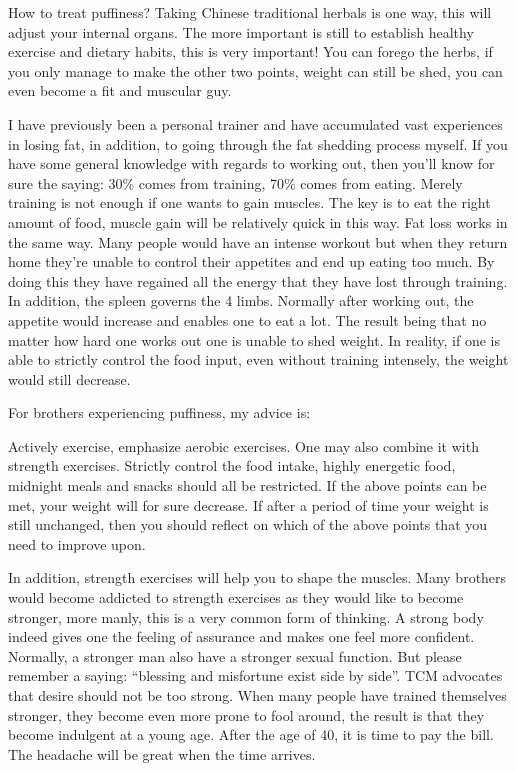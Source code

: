 \documentclass[
]{book}
\begin{document}
How to treat puffiness? Taking Chinese traditional herbals is one way, this will adjust your internal organs. The more important is still to establish healthy exercise and dietary habits, this is very important! You can forego the herbs, if you only manage to make the other two points, weight can still be shed, you can even become a fit and muscular guy.

I have previously been a personal trainer and have accumulated vast experiences in losing fat, in addition, to going through the fat shedding process myself. If you have some general knowledge with regards to working out, then you'll know for sure the saying: 30\% comes from training, 70\% comes from eating. Merely training is not enough if one wants to gain muscles. The key is to eat the right amount of food, muscle gain will be relatively quick in this way. Fat loss works in the same way. Many people would have an intense workout but when they return home they're unable to control their appetites and end up eating too much. By doing this they have regained all the energy that they have lost through training. In addition, the spleen governs the 4 limbs. Normally after working out, the appetite would increase and enables one to eat a lot. The result being that no matter how hard one works out one is unable to shed weight. In reality, if one is able to strictly control the food input, even without training intensely, the weight would still decrease.

For brothers experiencing puffiness, my advice is:

Actively exercise, emphasize aerobic exercises. One may also combine it with strength exercises.
Strictly control the food intake, highly energetic food, midnight meals and snacks should all be restricted.
If the above points can be met, your weight will for sure decrease. If after a period of time your weight is still unchanged, then you should reflect on which of the above points that you need to improve upon.

In addition, strength exercises will help you to shape the muscles. Many brothers would become addicted to strength exercises as they would like to become stronger, more manly, this is a very common form of thinking. A strong body indeed gives one the feeling of assurance and makes one feel more confident. Normally, a stronger man also have a stronger sexual function. But please remember a saying: ``blessing and misfortune exist side by side''. TCM advocates that desire should not be too strong. When many people have trained themselves stronger, they become even more prone to fool around, the result is that they become indulgent at a young age. After the age of 40, it is time to pay the bill. The headache will be great when the time arrives.
\end{document}
